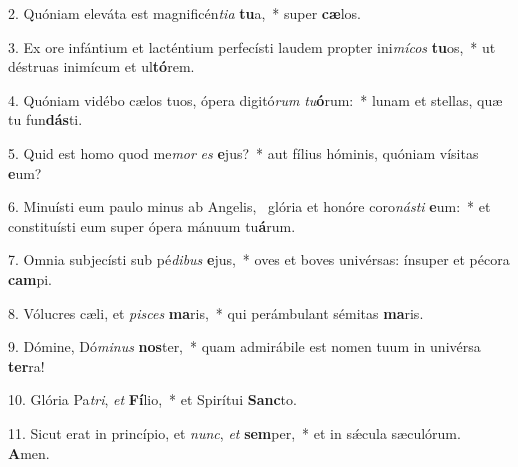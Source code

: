2. Quóniam eleváta est magnificén\textit{ti}\textit{a} \textbf{tu}a,~*  super \textbf{cæ}los.\

3. Ex ore infántium et lacténtium perfecísti laudem propter ini\textit{mí}\textit{cos} \textbf{tu}os,~*  ut déstruas inimícum et ul\textbf{tó}rem.\

4. Quóniam vidébo cælos tuos, ópera digitó\textit{rum} \textit{tu}\textbf{ó}rum:~*  lunam et stellas, quæ tu fun\textbf{dás}ti.\

5. Quid est homo quod me\textit{mor} \textit{es} \textbf{e}jus?~*  aut fílius hóminis, quóniam vísitas \textbf{e}um?\

6. Minuísti eum paulo minus ab Angelis, \dag\  glória et honóre coro\textit{nás}\textit{ti} \textbf{e}um:~*  et constituísti eum super ópera mánuum tu\textbf{á}rum.\

7. Omnia subjecísti sub pé\textit{di}\textit{bus} \textbf{e}jus,~*  oves et boves univérsas: ínsuper et pécora \textbf{cam}pi.\

8. Vólucres cæli, et \textit{pi}\textit{sces} \textbf{ma}ris,~*  qui perámbulant sémitas \textbf{ma}ris.\

9. Dómine, Dó\textit{mi}\textit{nus} \textbf{nos}ter,~*  quam admirábile est nomen tuum in univérsa \textbf{ter}ra!\

10. Glória Pa\textit{tri}, \textit{et} \textbf{Fí}lio,~*  et Spirítui \textbf{Sanc}to.\

11. Sicut erat in princípio, et \textit{nunc}, \textit{et} \textbf{sem}per,~*  et in sǽcula sæculórum. \textbf{A}men.\

